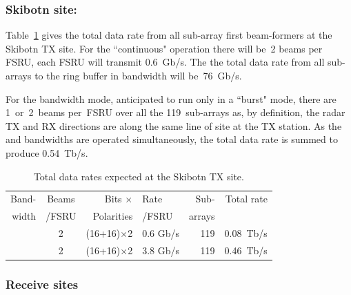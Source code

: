 \documentclass[12pt,a4paper]{article}
\begin{document}
\iffalse
\subsubsection{Skibotn site:}
\label{sssec:rates:skib}

Table~\ref{tab:skib:rates} gives the total data rate from all sub-array first beam-formers at the Skibotn TX site.
For the \NBW{} ``continuous" operation there will be~2 beams per FSRU, 
each FSRU will transmit 0.6~Gb/s.
The the total data rate from all sub-arrays to the ring buffer in \NBW{} bandwidth will be~76~Gb/s.

For the \WBW{} bandwidth mode, anticipated to run only in a ``burst" mode, there are 1~or~2~beams per~FSRU over all the 119~sub-arrays as, by definition, the radar TX and RX directions are along the same line of site at the TX station.
As the \NBW{} and \WBW{} bandwidths are operated simultaneously, the  total data rate is summed to produce 0.54~Tb/s.
\begin{table}[h]
\centering
\begin{tabular}{rcrlr|r}
{Band-} & {Beams} & {Bits $\times$}    & Rate    & Sub- & {Total rate} \\
{width} & {/FSRU} & {Polarities} & {/FSRU} & arrays & \\ \hline
\NBW{} & 2 & (16+16)$\times$2 & 0.6 Gb/s & 119 & 0.08~Tb/s \\
\WBW{} & 2 & (16+16)$\times$2 & 3.8 Gb/s & 119 & 0.46~Tb/s \\
\end{tabular}
\caption{Total data rates expected at the Skibotn TX site. \label{tab:skib:rates}}
\end{table}

\subsubsection{Receive sites}
\label{sssec:rates:rx}
\end{document}
